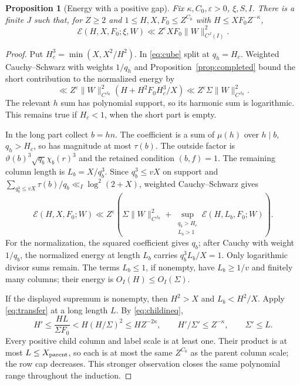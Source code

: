\documentclass[11pt,a4paper]{article}
\numberwithin{equation}{section}
\newtheorem{proposition}[theorem]{Proposition}
\theoremstyle{definition}
\theoremstyle{remark}
\newcommand{\eps}{\varepsilon}
\newcommand{\E}{\mathcal E}
\begin{document}
\begin{proposition}[Energy with a positive gap]\label{prop:energy}
Fix $\kappa,C_0,\eps>0$, $\xi,S,I$. There is a finite $J$ such that, for $Z\ge2$ and $1\le H,X,F_0\le Z^{C_0}$ with $H\le XF_0Z^{-\kappa}$,
\begin{equation}\label{eq:energy}
 \E(H,X,F_0;\xi,W)\ll Z^\eps XF_0\|W\|_{C^J(I)}^2 .
\end{equation}
\end{proposition}
\begin{proof}
Put $H_c^3=\min(X,X^2/H^2)$. In \eqref{eq:cube} split at $q_h=H_c$. Weighted Cauchy--Schwarz with weights $1/q_h$ and Proposition~\ref{prop:completed} bound the short contribution to the normalized energy by
\[
 \ll Z^\eps\|W\|_{C^{J_R}}^2
                (H+H^2F_0H_c^3/X)\ll Z^\eps\Sigma\|W\|_{C^{J_R}}^2.
\]
The relevant $h$ sum has polynomial support, so its harmonic sum is logarithmic. This remains true if $H_c<1$, when the short part is empty.

In the long part collect $b=hn$. The coefficient is a sum of $\mu(h)$ over $h\mid b$, $q_h>H_c$, so has magnitude at most $\tau(b)$. The outside factor is $\vartheta(b)^3\sqrt{q_b}\chi_b(r)^3$ and the retained condition $(b,f)=1$. The remaining column length is $L_b=X/q_b^3$. Since $q_b^3\le vX$ on support and
$\sum_{q_b^3\le vX}\tau(b)/q_b\ll_I\log^2(2+X)$,
weighted Cauchy--Schwarz gives
\begin{equation}\label{eq:long}
 \E(H,X,F_0;W)\ll Z^\eps
 \left(\Sigma\|W\|_{C^{J_R}}^2+
       \sup_{\substack{q_b>H_c\\L_b>1}}\E(H,L_b,F_0;W)\right).
\end{equation}
For the normalization, the squared coefficient gives $q_b$; after Cauchy with weight $1/q_b$, the normalized energy at length $L_b$ carries $q_b^3L_b/X=1$. Only logarithmic divisor sums remain. The terms $L_b\le1$, if nonempty, have $L_b\ge1/v$ and finitely many columns; their energy is $O_I(H)\le O_I(\Sigma)$.

If the displayed supremum is nonempty, then $H^2>X$ and $L_b<H^2/X$. Apply \eqref{eq:transfer} at a long length $L$. By \eqref{eq:childineq},
\[
 H'\le\frac{HL}{\Sigma F_0}
       <H(H/\Sigma)^2\le HZ^{-2\kappa},
 \qquad H'/\Sigma'\le Z^{-\kappa},\qquad \Sigma'\le L.
\]
Every positive child column and label scale is at least one. Their product is at most $L\le X_{\rm parent}$, so each is at most the same $Z^{C_0}$ as the parent column scale; the row cap decreases. This stronger observation closes the same polynomial range throughout the induction.


\end{proof}
\end{document}
